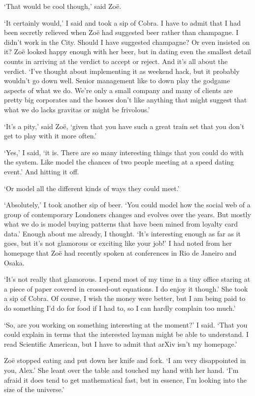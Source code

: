 `That would be cool though,' said Zoë.

`It certainly would,' I said and took a sip of Cobra. I have to
admit that I had been secretly relieved when Zoë had suggested
beer rather than champagne. I didn't work in the City. Should I have
suggested champagne? Or even insisted on it? Zoë looked happy
enough with her beer, but in dating even the smallest detail counts
in arriving at the verdict to accept or reject. And it's all about the verdict. `I've thought about
implementing it as weekend hack, but it probably wouldn't go down
well. Senior management like to down play the godgame aspects of
what we do. We're  only a small company and many of clients are
pretty big corporates and the bosses don't like anything that might
suggest that what we do lacks gravitas or might be frivolous.'

`It's a pity,' said Zoë, `given that you have such a great train
set that you don't get to play with it more often.'

`Yes,' I said, `it is. There are so many interesting things that you
could do with the system. Like model the chances of two people
meeting at a speed dating event.' And hitting it off.

`Or model all the different kinds of ways they could meet.'

`Absolutely,' I took another sip of beer. `You could model how the
social web of a group of contemporary Londoners changes and evolves
over the years. But mostly what we do is model buying patterns that
have been mined from loyalty card data.' Enough about me already, I
thought. `It's interesting enough as far as it goes, but it's not
glamorous or exciting like your job!' I had noted from her homepage
that Zoë had recently spoken at conferences in Rio de Janeiro
and Osaka.

`It's not really that glamorous. I spend most of my time
in a tiny office staring at a piece of paper covered in crossed-out
equations. I do enjoy it though.' She took a sip of Cobra. Of course, I
wish the money were better, but I am being paid to do something I'd
do for food if I had to, so I can hardly complain too much.'

`So, are you working on something interesting at the moment?' I
said. `That you could explain in terms that the interested layman
might be able to understand. I read {\twelvesl Scientific
American\/}, but I have to admit that arXiv isn't my homepage.'

Zoë stopped eating and put down her knife and fork. `I am very
disappointed in you, Alex.' She leant over the table and touched my
hand with her hand. `I'm afraid it does tend to get
mathematical fast, but in essence, I'm looking into the
size of the universe.'

